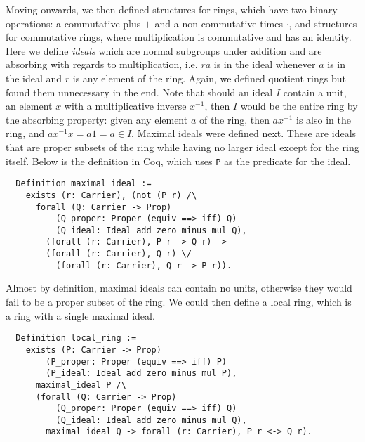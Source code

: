 \documentclass{article}
\begin{document}
Moving onwards, we then defined structures for rings, which have two binary
operations: a commutative plus \(+\) and a non-commutative times \(\cdot\), and
structures for commutative rings, where multiplication is commutative and has
an identity. Here we define \emph{ideals} which are normal subgroups under
addition and are absorbing with regards to multiplication, i.e. \(r a\) is in
the ideal whenever \(a\) is in the ideal and \(r\) is any element of the ring.
Again, we defined quotient rings but found them unnecessary in the end. Note
that should an ideal \(I\) contain a unit, an element \(x\) with a
multiplicative inverse \(x^{-1}\), then \(I\) would be the entire ring by the
absorbing property: given any element \(a\) of the ring, then \(a x^{-1}\) is
also in the ring, and \(a x^{-1} x = a 1 = a\in I\). Maximal ideals were
defined next. These are ideals that are proper subsets of the ring while having
no larger ideal except for the ring itself. Below is the definition in Coq,
which uses \texttt{P} as the predicate for the ideal.
\begin{verbatim}
  Definition maximal_ideal :=
    exists (r: Carrier), (not (P r) /\
      forall (Q: Carrier -> Prop)
          (Q_proper: Proper (equiv ==> iff) Q)
          (Q_ideal: Ideal add zero minus mul Q),
        (forall (r: Carrier), P r -> Q r) ->
        (forall (r: Carrier), Q r) \/
          (forall (r: Carrier), Q r -> P r)).
\end{verbatim}
Almost by definition, maximal ideals can contain no units, otherwise they would
fail to be a proper subset of the ring. We could then define a local ring,
which is a ring with a single maximal ideal.
\begin{verbatim}
  Definition local_ring :=
    exists (P: Carrier -> Prop)
        (P_proper: Proper (equiv ==> iff) P)
        (P_ideal: Ideal add zero minus mul P),
      maximal_ideal P /\
      (forall (Q: Carrier -> Prop)
          (Q_proper: Proper (equiv ==> iff) Q)
          (Q_ideal: Ideal add zero minus mul Q),
        maximal_ideal Q -> forall (r: Carrier), P r <-> Q r).
\end{verbatim}
\end{document}
